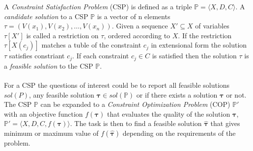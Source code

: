 A \emph{Constraint Satisfaction Problem} (CSP) is defined as a triple $\mathbb{P} = \langle X,D,C \rangle$. A 
\emph{candidate solution} to a CSP $\mathbb{P}$ is a vector of n elements 
$\tau = (V(x_1), V(x_2), \dots , V(x_n))$.  %
Given a sequence $X' \subseteq X$ of variables $\tau[X']$ is called a restriction on $\tau$, ordered according to 
$X$. If the restriction $\tau[X(c_j)]$ matches a tuble of the constraint $c_j$ in extensional form the solution $\tau$ 
satisfies constriant $c_j$. If each constraint $c_j \in C$ is satisfied then the solution $\tau$ is a \emph{feasible 
solution} to the CSP $\mathbb{P}$. \\
 \\ 
For a CSP the questions of interest could be to report all feasible solutions $sol(P)$, any feasible solution 
$\mathbf{\tau}\in sol(\mathbb{P})$ or if there exists a solution $\mathbf{\tau}$ or not. \\
The CSP $\mathbb{P}$ can be expanded to a \emph{Constraint Optimization Problem} (COP) $\mathbb{P'}$ 
with an objective function $f(\mathbf{\tau})$ that evaluates the quality of the solution $\mathbf{\tau}$, $\mathbb{P'} 
= \langle X,D,C,f(\mathbf{\tau}) \rangle$. The task is then to find a feasible solution $\hat{\mathbf{\tau}}$ that 
gives minimum or maximum value of $f(\hat{\mathbf{\tau}})$ depending on the requirements of the problem. 
